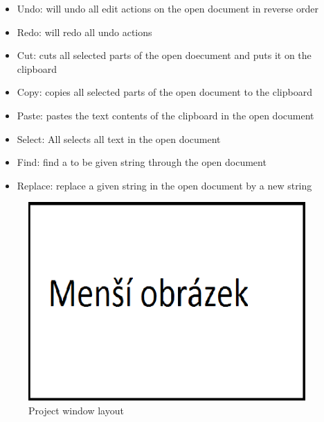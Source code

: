                     \begin{itemize}
                        \item Undo: will undo all edit actions on the open document in reverse order
                        \item Redo: will redo all undo actions
                        \item Cut: cuts all selected parts of the open doecument and puts it on the clipboard
                        \item Copy: copies all selected parts of the open document to the clipboard
                        \item Paste: pastes the text contents of the clipboard in the open document
                        \item Select: All selects all text in the open document
                        \item Find: find a to be given string through the open document
                        \item Replace: replace a given string in the open document by a new string
                    \end{itemize}

                        \begin{figure}
                            \centering{}
                            \includegraphics [width=300pt]{img/mensi_obrazek.png}
                            \caption{Project window layout}
                        \end{figure}

